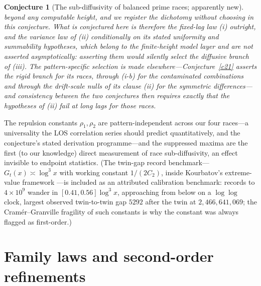 \documentclass[11pt]{article}
\newtheorem{conjecture}{Conjecture}
\theoremstyle{definition}
\begin{document}
\begin{conjecture}[The sub-diffusivity of balanced prime races;
apparently new]
beyond any computable height, and we register the dichotomy without
choosing \emph{in this conjecture}.  What is conjectured here is
therefore the fixed-lag law (i) outright, and the variance law of
(ii) \emph{conditionally on} its stated uniformity and summability
hypotheses, which belong to the finite-height model layer and are
not asserted asymptotically: asserting them would silently select
the diffusive branch of (iii).  The pattern-specific selection is made elsewhere---Conjecture~\ref{c21} asserts the rigid branch for its races, through (i-b) for the contaminated combinations and through the drift-scale nulls of its clause (ii) for the symmetric differences---and consistency between the two
conjectures then requires exactly that the hypotheses of (ii) fail
at long lags for those races.
\end{conjecture}

The repulsion constants
$\rho_1,\rho_2$ are pattern-independent across our four races---a
universality the LOS correlation series should predict
quantitatively, and the conjecture's stated derivation programme---and the
suppressed maxima are the first (to our knowledge) direct measurement
of race sub-diffusivity, an effect invisible to endpoint statistics.
(The twin-gap record benchmark---$G_t(x)\asymp\log^3x$
with working constant $1/(2C_2)$, inside Kourbatov's
extreme-value framework \cite{Kourbatov}---is included as an
attributed calibration benchmark: records to $4\times10^9$ wander in
$[0.41,0.56]\log^3x$, approaching from below on a $\log\log$ clock,
largest observed twin-to-twin gap $5292$ after the twin at
$2{,}466{,}641{,}069$; the Cram\'er--Granville fragility of such
constants \cite{Granville} is why the constant was always flagged as
first-order.)

\section{Family laws and second-order refinements}
\end{document}
